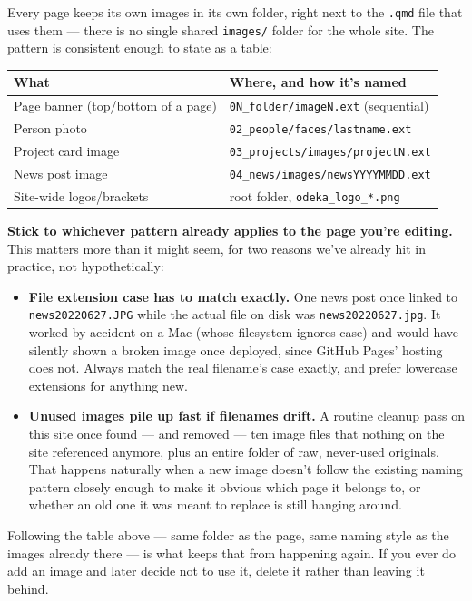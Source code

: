 \documentclass[11pt]{article}
\newcommand{\term}[1]{\textbf{#1}}
\newcommand{\file}[1]{\texttt{#1}}
\begin{document}
Every page keeps its own images in its own folder, right next to the
\file{.qmd} file that uses them --- there is no single shared
\file{images/} folder for the whole site. The pattern is consistent
enough to state as a table:

\begin{center}
\begin{tabular}{ll}
\toprule
\textbf{What} & \textbf{Where, and how it's named} \\
\midrule
Page banner (top/bottom of a page) & \file{0N\_folder/imageN.ext}
(sequential) \\
Person photo & \file{02\_people/faces/lastname.ext} \\
Project card image & \file{03\_projects/images/projectN.ext} \\
News post image & \file{04\_news/images/newsYYYYMMDD.ext} \\
Site-wide logos/brackets & root folder, \file{odeka\_logo\_*.png} \\
\bottomrule
\end{tabular}
\end{center}

\term{Stick to whichever pattern already applies to the page you're
editing.} This matters more than it might seem, for two reasons we've
already hit in practice, not hypothetically:

\begin{itemize}
    \item \term{File extension case has to match exactly.} One news
    post once linked to \file{news20220627.JPG} while the actual file
    on disk was \file{news20220627.jpg}. It worked by accident on a Mac
    (whose filesystem ignores case) and would have silently shown a
    broken image once deployed, since GitHub Pages' hosting does not.
    Always match the real filename's case exactly, and prefer lowercase
    extensions for anything new.
    \item \term{Unused images pile up fast if filenames drift.} A
    routine cleanup pass on this site once found --- and removed --- ten
    image files that nothing on the site referenced anymore, plus an
    entire folder of raw, never-used originals. That happens naturally
    when a new image doesn't follow the existing naming pattern closely
    enough to make it obvious which page it belongs to, or whether an
    old one it was meant to replace is still hanging around.
\end{itemize}

Following the table above --- same folder as the page, same naming
style as the images already there --- is what keeps that from
happening again. If you ever do add an image and later decide not to
use it, delete it rather than leaving it behind.
\end{document}
